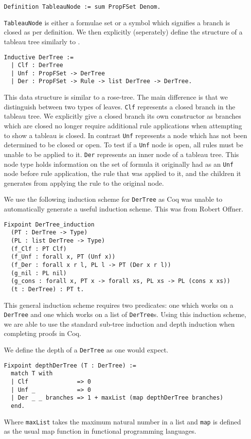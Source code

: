 \documentclass{llncs}
\begin{document}
\begin{verbatim}
Definition TableauNode := sum PropFSet Denom.
\end{verbatim}
%
\verb+TableauNode+ is either a formulae set or a symbol which signifies a
branch is closed as per definition. We then explicitly (seperately) define the
structure of a tableau tree similarly to \cite{dawson2003new}.
%
\begin{verbatim}
Inductive DerTree :=
  | Clf : DerTree
  | Unf : PropFSet -> DerTree
  | Der : PropFSet -> Rule -> list DerTree -> DerTree.
\end{verbatim}
%
This data structure is similar to a rose-tree. The main difference is
that we distinguish between two types of leaves. \verb+Clf+ represents a closed
branch in the tableau tree. We explicitly give a closed branch its own
constructor as branches which are closed no longer require additional rule
applications when attempting to show a tableau is closed. In contrast
\verb+Unf+ represents a node which has not been determined to be closed or
open. To test if a \verb+Unf+ node is open, all rules must be unable to be
applied to it. \verb+Der+ represents an inner node of a tableau tree. This node
type holds information on the set of formula it originally had as an \verb+Unf+
node before rule application, the rule that was applied to it, and the children
it generates from applying the rule to the original node.

We use the following induction scheme for \verb+DerTree+ as Coq was unable to
automatically generate a useful induction scheme. This was from Robert Offner.
%
\begin{verbatim}
Fixpoint DerTree_induction
  (PT : DerTree -> Type)
  (PL : list DerTree -> Type)
  (f_Clf : PT Clf)
  (f_Unf : forall x, PT (Unf x))
  (f_Der : forall x r l, PL l -> PT (Der x r l))
  (g_nil : PL nil)
  (g_cons : forall x, PT x -> forall xs, PL xs -> PL (cons x xs))
  (t : DerTree) : PT t.
\end{verbatim}
%
This general induction scheme requires two predicates: one which works on a
\verb+DerTree+ and one which works on a list of \verb+DerTree+s.
Using this induction scheme, we are able to use the standard sub-tree induction
and depth induction when completing proofs in Coq.

We define the depth of a \verb+DerTree+ as one would expect.
%
\begin{verbatim}
Fixpoint depthDerTree (T : DerTree) :=
  match T with
  | Clf              => 0
  | Unf _            => 0
  | Der _ _ branches => 1 + maxList (map depthDerTree branches)
  end.
\end{verbatim}
%
Where \verb+maxList+ takes the maximum natural number in a list and \verb+map+
is defined as the usual map function in functional programming languages.
%
\end{document}
